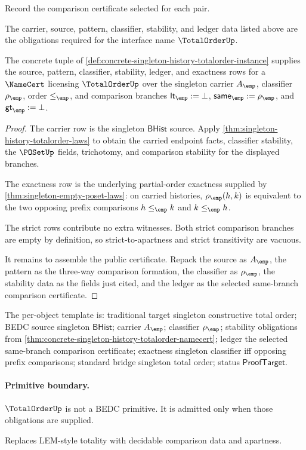 \begin{definition}
\label{def:totalorder-ledger-policy}
Record the comparison certificate selected for each pair.
\end{definition}

\begin{definition}
\label{def:totalorder-certificate-obligations}
The carrier, source, pattern, classifier, stability, and ledger data listed above are the obligations required for the interface name $\TotalOrderUp$.
\end{definition}

\begin{theorem}
\label{thm:concrete-singleton-history-totalorder-namecert}
The concrete tuple of
\autoref{def:concrete-singleton-history-totalorder-instance} supplies the
source, pattern, classifier, stability, ledger, and exactness rows for a
$\NameCert$ licensing $\TotalOrderUp$ over the singleton carrier $A_{\emp}$,
classifier $\rho_{\emp}$, order $\le_{\emp}$, and comparison branches
$\mathsf{lt}_{\emp}:=\bot$, $\mathsf{same}_{\emp}:=\rho_{\emp}$, and
$\mathsf{gt}_{\emp}:=\bot$.
\end{theorem}
\begin{proof}
The carrier row is the singleton $\mathsf{BHist}$ source. Apply
\autoref{thm:singleton-history-totalorder-laws} to obtain the carried endpoint
facts, classifier stability, the $\POSetUp$ fields, trichotomy, and comparison
stability for the displayed branches.

The exactness row is the underlying partial-order exactness supplied by
\autoref{thm:singleton-empty-poset-laws}: on carried histories,
$\rho_{\emp}(h,k)$ is equivalent to the two opposing prefix comparisons
$h\le_{\emp}k$ and $k\le_{\emp}h$.

The strict rows contribute no extra witnesses. Both strict comparison branches
are empty by definition, so strict-to-apartness and strict transitivity are
vacuous.

It remains to assemble the public certificate. Repack the source as
$A_{\emp}$, the pattern as the three-way comparison formation, the classifier
as $\rho_{\emp}$, the stability data as the fields just cited, and the ledger
as the selected same-branch comparison certificate.
\end{proof}

The per-object template is: traditional target singleton constructive total
order; BEDC source singleton $\mathsf{BHist}$; carrier $A_{\emp}$; classifier
$\rho_{\emp}$; stability obligations from
\autoref{thm:concrete-singleton-history-totalorder-namecert}; ledger the
selected same-branch comparison certificate; exactness singleton classifier
iff opposing prefix comparisons; standard bridge singleton total order; status
$\mathsf{ProofTarget}$.

\paragraph{Primitive boundary.}
$\TotalOrderUp$ is not a BEDC primitive. It is admitted only when those obligations are supplied.

\begin{remark}
\label{rem:totalorder-zero-axiom-note}
Replaces LEM-style totality with decidable comparison data and apartness.
\end{remark}
